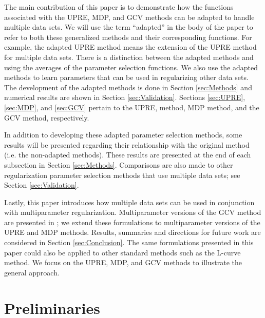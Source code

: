 \documentclass[12pt]{article}
\begin{document}
The main contribution of this paper is to demonstrate how the functions associated with the UPRE, MDP, and GCV methods can be adapted to handle multiple data sets. We will use the term ``adapted'' in the body of the paper to refer to both these generalized methods and their corresponding functions. For example, the adapted UPRE method means the extension of the UPRE method for multiple data sets. There is a distinction between the adapted methods and using the averages of the parameter selection functions. We also use the adapted methods to learn parameters that can be used in regularizing other data sets. The development of the adapted methods is done in Section \ref{sec:Methods} and numerical results are shown in Section \ref{sec:Validation}. Sections \ref{sec:UPRE}, \ref{sec:MDP}, and \ref{sec:GCV} pertain to the UPRE, method, MDP method, and the GCV method, respectively.  \par 
In addition to developing these adapted parameter selection methods, some results will be presented regarding their relationship with the original method (i.e. the non-adapted methods). These results are presented at the end of each subsection in Section \ref{sec:Methods}. Comparisons are also made to other regularization parameter selection methods that use multiple data sets; see Section \ref{sec:Validation}. \par
Lastly, this paper introduces how multiple data sets can be used in conjunction with multiparameter regularization. Multiparameter versions of the GCV method are presented in \cite{ChungEasleyOLeary,ModarresiGolub2}; we extend these formulations to multiparameter versions of the UPRE and MDP methods. Results, summaries and directions for future work are considered in Section \ref{sec:Conclusion}. The same formulations presented in this paper could also be applied to other standard methods such as the L-curve method. We focus on the UPRE, MDP, and GCV methods to illustrate the general approach.

\section{Preliminaries} \label{sec:Preliminaries}
\end{document}
